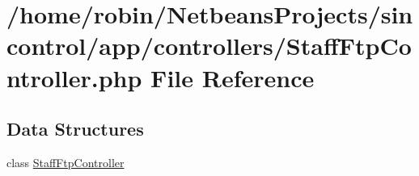 \hypertarget{_staff_ftp_controller_8php}{}\section{/home/robin/\+Netbeans\+Projects/sincontrol/app/controllers/\+Staff\+Ftp\+Controller.php File Reference}
\label{_staff_ftp_controller_8php}
\subsection*{Data Structures}
\begin{DoxyCompactItemize}
\item 
class \hyperlink{class_staff_ftp_controller}{Staff\+Ftp\+Controller}
\end{DoxyCompactItemize}
